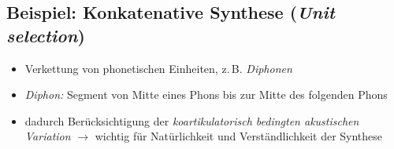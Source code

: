 \documentclass[11pt]{book}
\begin{document}
  \subsection*{Beispiel: Konkatenative Synthese (\emph{Unit selection})}

  \begin{itemize}
  \item Verkettung von phonetischen Einheiten, z.\,B. \emph{Diphonen}
  \item \emph{Diphon:} Segment von Mitte eines Phons bis zur Mitte des folgenden Phons
  \item dadurch Berücksichtigung der \emph{koartikulatorisch bedingten akustischen Variation} $\longrightarrow$ wichtig für Natürlichkeit und Verständlichkeit der Synthese
  \end{itemize}
\end{document}
